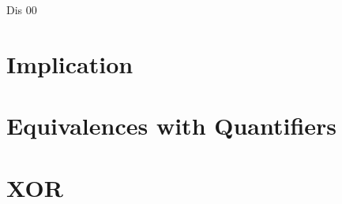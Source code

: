 \documentclass[12pt,a4paper]{article}
\begin{document}
\raggedright

\begin{center}
\huge{Dis 00}
\end{center}

\section{Implication}

\section{Equivalences with Quantifiers}

\section{XOR}
\end{document}
